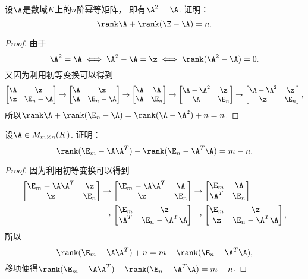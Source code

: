 \begin{example}\label{example:幂等矩阵.幂等矩阵的秩的性质1}
设\(\A\)是数域\(K\)上的\(n\)阶幂等矩阵，
即有\(\A^2=\A\).
证明：\[
	\rank\A+\rank(\E-\A)=n.
\]
\begin{proof}
由于\[
	\A^2=\A
	\iff
	\A^2-\A=\z
	\iff
	\rank(\A^2-\A)=0.
\]
又因为利用初等变换可以得到\[
	\begin{bmatrix}
		\A & \z \\
		\z & \E_n-\A
	\end{bmatrix}
	\to \begin{bmatrix}
		\A & \z \\
		\A & \E_n-\A
	\end{bmatrix}
	\to \begin{bmatrix}
		\A & \A \\
		\A & \E_n
	\end{bmatrix}
	\to \begin{bmatrix}
		\A-\A^2 & \z \\
		\A & \E_n
	\end{bmatrix}
	\to \begin{bmatrix}
		\A-\A^2 & \z \\
		\z & \E_n
	\end{bmatrix},
\]
所以\(\rank\A+\rank(\E_n-\A)
=\rank(\A-\A^2)+n
=n\).
\end{proof}
\end{example}

\begin{example}
设\(\A \in M_{m \times n}(K)\).
证明：\[
	\rank(\E_m-\A\A^T)-\rank(\E_n-\A^T\A)=m-n.
\]
\begin{proof}
因为利用初等变换可以得到\begin{align*}
	\begin{bmatrix}
		\E_m-\A\A^T & \z \\
		\z & \E_n
	\end{bmatrix}
	&\to \begin{bmatrix}
		\E_m-\A\A^T & \A \\
		\z & \E_n
	\end{bmatrix}
	\to \begin{bmatrix}
		\E_m & \A \\
		\A^T & \E_n
	\end{bmatrix} \\
	&\to \begin{bmatrix}
		\E_m & \z \\
		\A^T & \E_n-\A^T\A
	\end{bmatrix}
	\to \begin{bmatrix}
		\E_m & \z \\
		\z & \E_n-\A^T\A
	\end{bmatrix},
\end{align*}
所以\[
	\rank(\E_m-\A\A^T)+n=m+\rank(\E_n-\A^T\A),
\]
移项便得\(\rank(\E_m-\A\A^T)-\rank(\E_n-\A^T\A)=m-n\).
\end{proof}
\end{example}

